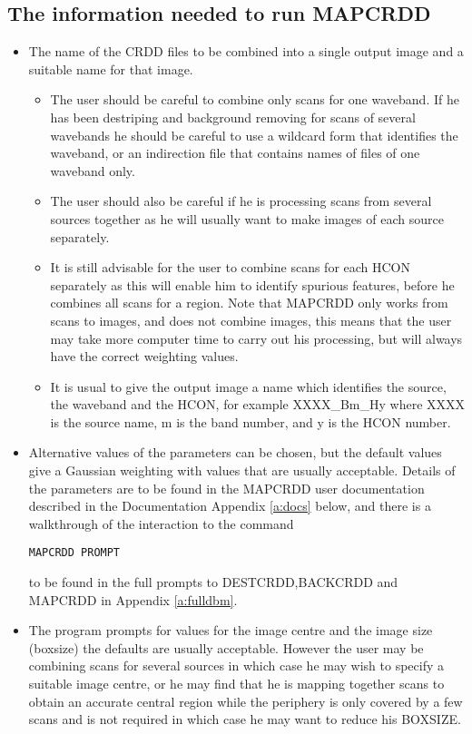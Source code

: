 \subsection{The information needed to run MAPCRDD}
\begin{itemize}
\item The name of the CRDD files to be combined into a single output image and
a suitable name for that image. 
\begin{itemize}
\item The user should be careful to combine only scans for one waveband. If he 
has been destriping and background removing for scans of several wavebands he 
should be careful to use a wildcard form that identifies the waveband, or an 
indirection file that contains names of files of one waveband only.
\item The user should also be careful if he is processing scans from several
sources together as he will usually want to make images of each source 
separately.
\item It is still advisable for the user to combine scans for each HCON 
separately as this will enable him to identify spurious features, before he 
combines all scans for a region. Note that MAPCRDD only works from scans to 
images, and does not combine images, this means that the user may take more
computer time to carry out his processing, but will always have the correct
weighting values.
\item It is usual to give the output image a name which identifies the source,
the waveband and the HCON, for example XXXX\_Bm\_Hy where XXXX is the source 
name, m is the band number, and y is the HCON number.
\end{itemize}
\item Alternative values of the parameters can be chosen, but the default values
give a Gaussian weighting with values that are usually acceptable. Details of
the parameters are to be found in the MAPCRDD user documentation described in
the Documentation Appendix \ref{a:docs} below, and there is a walkthrough of
the interaction to the command
\begin{small}
\begin{verbatim}
MAPCRDD PROMPT
\end{verbatim}
\end{small}
to be found in the full prompts to DESTCRDD,BACKCRDD and MAPCRDD in Appendix
\ref {a:fulldbm}.
\item The program prompts for  values for the image  centre and the image size
(boxsize) the defaults are usually acceptable. However the user may be
combining scans for several sources in which case he may wish to specify a
suitable image centre, or he may find that he is mapping together scans to
obtain an accurate central region while the periphery is only covered by a few
scans and is not required in which case he may want to reduce his BOXSIZE.
\end{itemize}
